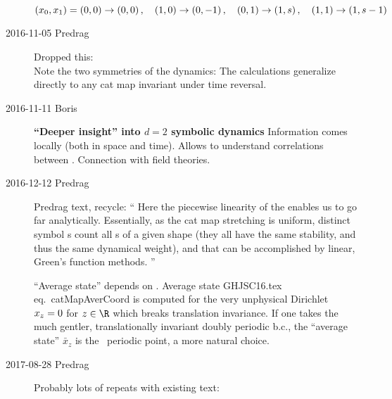\begin{description}
\[
  (x_{0},x_{1}) = (0,0) \to (0,0)
  \,,\quad
  (1,0) \to (0,-1)
  \,,\quad
  (0,1) \to (1,s)
  \,,\quad
  (1,1) \to (1,s-1)
\]



\item[2016-11-05 Predrag] Dropped this:
\\
Note the two  symmetries of the dynamics:
%
%
The calculations generalize directly to any cat map invariant
under time reversal.

\item[2016-11-11 Boris]
{\bf ``Deeper insight'' into $d=2$ symbolic dynamics}
Information comes locally (both in space and time). Allows to understand
correlations between {\twots}. Connection with field theories.

\item[2016-12-12 Predrag]

Predrag text, recycle: ``
Here the piecewise linearity of the {\catlatt} enables us to go far analytically.
Essentially, as the cat map stretching is uniform, distinct {\admissible} symbol
\brick s count all \brick s of a given shape (they all have the same
stability, and thus the same dynamical weight), and that can be accomplished
by linear, Green's function methods.
''

     {
``Average state'' depends on {\bcs}. Average state
GHJSC16.tex eq.~{catMapAverCoord} is computed for
the very unphysical Dirichlet {\bcs} $x_z=0$ for $z\in \R$
which breaks translation invariance.
If one takes the much gentler, translationally invariant doubly periodic b.c.,
the ``average state'' $\bar{x}_z$ is the \twot\ periodic point, a
more natural choice.
    }

\item[2017-08-28 Predrag]
Probably lots of repeats with existing text:



\end{description}
